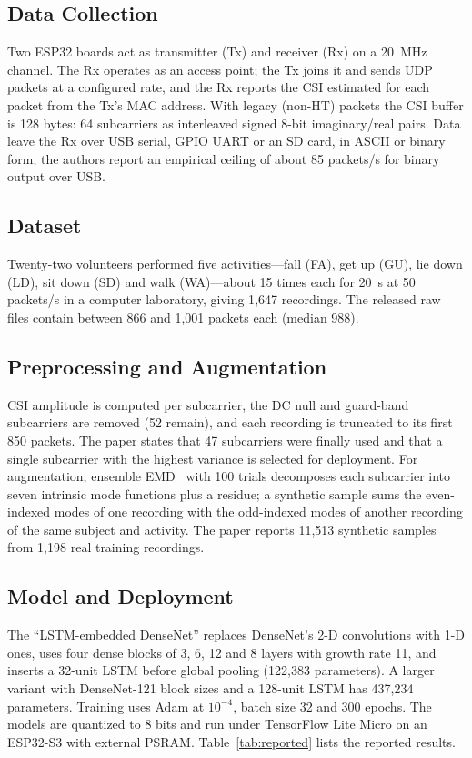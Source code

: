 \documentclass[journal]{IEEEtran}
\begin{document}
\subsection{Data Collection}
Two ESP32 boards act as transmitter (Tx) and receiver (Rx) on a 20~MHz channel. The
Rx operates as an access point; the Tx joins it and sends UDP packets at a configured
rate, and the Rx reports the CSI estimated for each packet from the Tx's MAC address.
With legacy (non-HT) packets the CSI buffer is 128 bytes: 64 subcarriers as
interleaved signed 8-bit imaginary/real pairs. Data leave the Rx over USB serial,
GPIO UART or an SD card, in ASCII or binary form; the authors report an empirical
ceiling of about 85 packets/s for binary output over USB.

\subsection{Dataset}
Twenty-two volunteers performed five activities---fall (FA), get up (GU), lie down
(LD), sit down (SD) and walk (WA)---about 15 times each for 20~s at 50 packets/s in a
computer laboratory, giving 1{,}647 recordings. The released raw files contain
between 866 and 1{,}001 packets each (median 988).

\subsection{Preprocessing and Augmentation}
CSI amplitude is computed per subcarrier, the DC null and guard-band subcarriers are
removed (52 remain), and each recording is truncated to its first 850 packets. The
paper states that 47 subcarriers were finally used and that a single subcarrier with
the highest variance is selected for deployment. For augmentation, ensemble
EMD~\cite{huang1998emd,wu2009eemd} with 100 trials decomposes each subcarrier into
seven intrinsic mode functions plus a residue; a synthetic sample sums the
even-indexed modes of one recording with the odd-indexed modes of another recording
of the same subject and activity. The paper reports 11{,}513 synthetic samples from
1{,}198 real training recordings.

\subsection{Model and Deployment}
The ``LSTM-embedded DenseNet'' replaces DenseNet's 2-D convolutions with 1-D ones,
uses four dense blocks of 3, 6, 12 and 8 layers with growth rate 11, and inserts a
32-unit LSTM before global pooling (122{,}383 parameters). A larger variant with
DenseNet-121 block sizes and a 128-unit LSTM has 437{,}234 parameters. Training uses
Adam at $10^{-4}$, batch size 32 and 300 epochs. The models are quantized to 8 bits
and run under TensorFlow Lite Micro on an ESP32-S3 with external PSRAM.
Table~\ref{tab:reported} lists the reported results.
\end{document}

